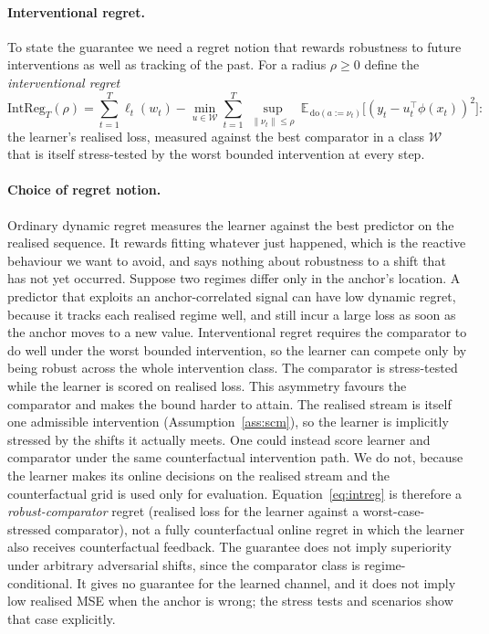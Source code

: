 \documentclass[12pt]{article}
\theoremstyle{plain}
\theoremstyle{remark}
\newcommand{\E}{\mathbb{E}}
\newcommand{\doop}{\mathrm{do}}
\begin{document}
\paragraph{Interventional regret.} To state the guarantee we need a regret notion that
rewards robustness to future interventions as well as tracking of the past. For a
radius $\rho\ge 0$ define the \emph{interventional regret}
\begin{equation}\label{eq:intreg}
\mathrm{IntReg}_T(\rho)=\sum_{t=1}^T\ell_t(w_t)
 -\min_{u\in\mathcal{W}}\sum_{t=1}^T\ \sup_{\|\nu_t\|\le\rho}\
 \E_{\,\doop(a:=\nu_t)}\!\big[(y_t-u_t^\top\phi(x_t))^2\big]:
\end{equation}
the learner's realised loss, measured against the best comparator in a class
$\mathcal{W}$ that is itself stress-tested by the worst bounded intervention at every
step.

\paragraph{Choice of regret notion.} Ordinary dynamic regret measures the learner
against the best predictor on the realised sequence. It rewards fitting whatever just
happened, which is the reactive behaviour we want to avoid, and says nothing about
robustness to a shift that has not yet occurred. Suppose two regimes differ only in
the anchor's location. A predictor that exploits an anchor-correlated signal can have
low dynamic regret, because it tracks each realised regime well, and still incur a
large loss as soon as the anchor moves to a new value. Interventional regret requires
the comparator to do well under the worst bounded intervention, so the learner can
compete only by being robust across the whole intervention class. The comparator is
stress-tested while the learner is scored on realised loss. This asymmetry favours the
comparator and makes the bound harder to attain. The realised stream is itself one
admissible intervention (Assumption~\ref{ass:scm}), so the learner is implicitly
stressed by the shifts it actually meets. One could instead score learner and
comparator under the same counterfactual intervention path. We do not, because the
learner makes its online decisions on the realised stream and the counterfactual grid
is used only for evaluation. Equation~\eqref{eq:intreg} is therefore a
\emph{robust-comparator} regret (realised loss for the learner against a
worst-case-stressed comparator), not a fully counterfactual online regret in which the
learner also receives counterfactual feedback. The guarantee does not imply
superiority under arbitrary adversarial shifts, since the comparator class is
regime-conditional. It gives no guarantee for the learned channel, and it does not
imply low realised MSE when the anchor is wrong; the stress tests and scenarios show
that case explicitly.
\end{document}
